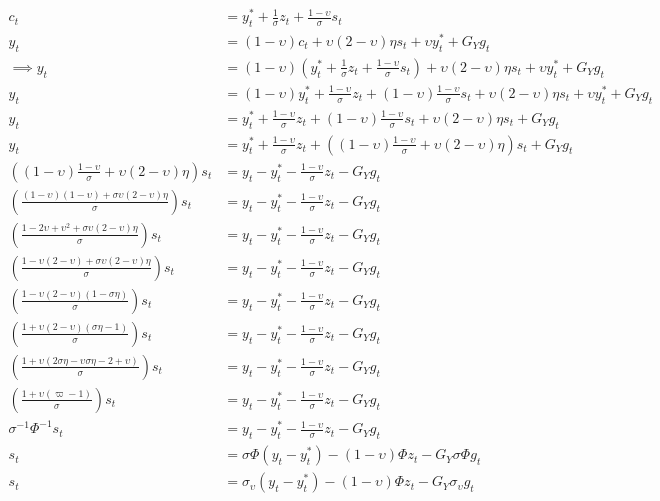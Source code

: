 \begin{align}
    c_t & = y^*_t + \frac{1}{\sigma}z_t + \frac{1-\upsilon}{\sigma}s_t\\
    y_t &= (1-\upsilon)c_t + \upsilon (2-\upsilon)\eta s_t + \upsilon y^*_t + G_Y g_t\\
    \implies y_t &= (1-\upsilon)\left( y^*_t + \frac{1}{\sigma}z_t + \frac{1-\upsilon}{\sigma}s_t \right) + \upsilon (2-\upsilon)\eta s_t + \upsilon y^*_t + G_Y g_t\\
    y_t &= (1-\upsilon)y^*_t + \frac{1-\upsilon}{\sigma}z_t + (1-\upsilon)\frac{1-\upsilon}{\sigma}s_t + \upsilon (2-\upsilon)\eta s_t + \upsilon y^*_t + G_Y g_t\\
    y_t &= y^*_t + \frac{1-\upsilon}{\sigma}z_t + (1-\upsilon)\frac{1-\upsilon}{\sigma}s_t + \upsilon (2-\upsilon)\eta s_t + G_Y g_t\\
    y_t &= y^*_t + \frac{1-\upsilon}{\sigma}z_t + \left((1-\upsilon)\frac{1-\upsilon}{\sigma} + \upsilon (2-\upsilon)\eta \right) s_t + G_Y g_t\\
    \left((1-\upsilon)\frac{1-\upsilon}{\sigma} + \upsilon (2-\upsilon)\eta \right) s_t &= y_t - y^*_t - \frac{1-\upsilon}{\sigma}z_t - G_Y g_t\\
    \left(\frac{(1-\upsilon)(1-\upsilon) + \sigma\upsilon (2-\upsilon)\eta}{\sigma} \right) s_t &= y_t - y^*_t - \frac{1-\upsilon}{\sigma}z_t - G_Y g_t\\
    \left(\frac{1 -2\upsilon + \upsilon^2 + \sigma\upsilon (2-\upsilon)\eta}{\sigma} \right) s_t &= y_t - y^*_t - \frac{1-\upsilon}{\sigma}z_t - G_Y g_t\\
    \left(\frac{1 - \upsilon (2-\upsilon) + \sigma\upsilon (2-\upsilon)\eta}{\sigma} \right) s_t &= y_t - y^*_t - \frac{1-\upsilon}{\sigma}z_t - G_Y g_t\\
    \left(\frac{1 - \upsilon (2-\upsilon)(1-\sigma \eta)}{\sigma} \right) s_t &= y_t - y^*_t - \frac{1-\upsilon}{\sigma}z_t - G_Y g_t\\
    \left(\frac{1 + \upsilon (2-\upsilon)(\sigma \eta - 1)}{\sigma} \right) s_t &= y_t - y^*_t - \frac{1-\upsilon}{\sigma}z_t - G_Y g_t\\
    \left(\frac{1 + \upsilon (2\sigma \eta-\upsilon\sigma \eta -2 + \upsilon)}{\sigma} \right) s_t &= y_t - y^*_t - \frac{1-\upsilon}{\sigma}z_t - G_Y g_t\\
    \left(\frac{1 + \upsilon (\varpi - 1)}{\sigma} \right) s_t &= y_t - y^*_t - \frac{1-\upsilon}{\sigma}z_t - G_Y g_t\\
    \sigma^{-1} \Phi^{-1} s_t &= y_t - y^*_t - \frac{1-\upsilon}{\sigma}z_t - G_Y g_t\\
    s_t &= \sigma \Phi(y_t - y^*_t) - (1-\upsilon)\Phi z_t - G_Y \sigma \Phi g_t\\
    s_t &= \sigma_\upsilon(y_t - y^*_t) - (1-\upsilon)\Phi z_t - G_Y \sigma_\upsilon g_t\\
\end{align}
